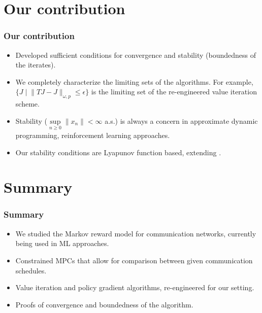 \documentclass{beamer}
\begin{document}
\section{Our contribution}
\begin{frame}
 \frametitle{Our contribution}
 \begin{itemize}
\item Developed sufficient conditions for convergence and stability (boundedness of the iterates). 
  \item We completely characterize the limiting sets of the algorithms. For example,
  {\color{purple}$\{J \mid \lVert TJ - J \rVert_{\omega, p} \le \epsilon \}$} is the limiting set of the
  re-engineered value iteration scheme.
\item Stability ($\sup \limits_{n \ge 0} \lVert x_n \rVert < \infty$ a.s.) is always a concern in approximate dynamic programming, reinforcement learning approaches.
  \item Our stability conditions are Lyapunov function based, extending \cite{p}.
 \end{itemize}
\end{frame}
\section{Summary}
\begin{frame}
 \frametitle{Summary}
 \begin{itemize}
 \item We studied the Markov reward model for communication networks, currently being used in ML
 approaches.
 \item Constrained MPCs that allow for comparison between given communication schedules.
 \item Value iteration and policy gradient algorithms, re-engineered for our setting.
 \item Proofs of convergence and boundedness of the algorithm.
 \end{itemize}
\end{frame}
\end{document}
